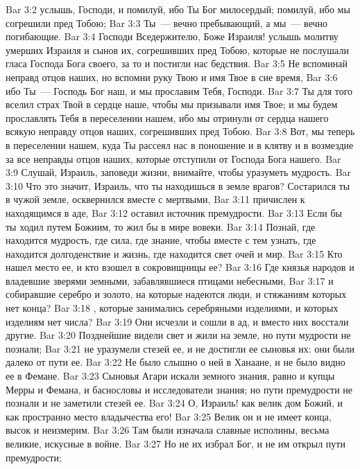 \vs Bar 3:2 услышь, Господи, и помилуй, ибо Ты Бог милосердый; помилуй, ибо мы согрешили пред Тобою;
\vs Bar 3:3 Ты~--- вечно пребывающий, а мы~--- вечно погибающие.
\vs Bar 3:4 Господи Вседержителю, Боже Израиля! услышь молитву умерших Израиля и сынов их, согрешивших пред Тобою, которые не послушали гласа Господа Бога своего, за то и постигли нас бедствия.
\vs Bar 3:5 Не вспоминай неправд отцов наших, но вспомни руку Твою и имя Твое в сие время,
\vs Bar 3:6 ибо Ты~--- Господь Бог наш, и мы прославим Тебя, Господи.
\vs Bar 3:7 Ты для того вселил страх Твой в сердце наше, чтобы мы призывали имя Твое; и мы будем прославлять Тебя в переселении нашем, ибо мы отринули от сердца нашего всякую неправду отцов наших, согрешивших пред Тобою.
\vs Bar 3:8 Вот, мы теперь в переселении нашем, куда Ты рассеял нас в поношение и в клятву и в возмездие за все неправды отцов наших, которые отступили от Господа Бога нашего.
\rsbpar\vs Bar 3:9 Слушай, Израиль, заповеди жизни, внимайте, чтобы уразуметь мудрость.
\vs Bar 3:10 Что это значит, Израиль, что ты находишься в земле врагов? Состарился ты в чужой земле, осквернился вместе с мертвыми,
\vs Bar 3:11 причислен к находящимся в аде,
\vs Bar 3:12 оставил источник премудрости.
\vs Bar 3:13 Если бы ты ходил путем Божиим, то жил бы в мире вовеки.
\vs Bar 3:14 Познай, где находится мудрость, где сила, где знание, чтобы вместе с тем узнать, где находится долгоденствие и жизнь, где находится свет очей и мир.
\vs Bar 3:15 Кто нашел место ее, и кто взошел в сокровищницы ее?
\vs Bar 3:16 Где князья народов и владевшие зверями земными, забавлявшиеся птицами небесными,
\vs Bar 3:17 и собиравшие серебро и золото, на которые надеются люди, и стяжаниям которых нет конца?
\vs Bar 3:18 , которые занимались серебряными изделиями, и которых изделиям нет числа?
\vs Bar 3:19 Они исчезли и сошли в ад, и вместо них восстали другие.
\vs Bar 3:20 Позднейшие видели свет и жили на земле, но пути мудрости не познали;
\vs Bar 3:21 не уразумели стезей ее, и не достигли ее сыновья их: они были далеко от пути ее.
\vs Bar 3:22 Не было слышно о ней в Ханаане, и не было видно ее в Фемане.
\vs Bar 3:23 Сыновья Агари искали земного знания, равно и купцы Мерры и Фемана, и баснословы и исследователи знания; но пути премудрости не познали и не заметили стезей ее.
\vs Bar 3:24 О, Израиль! как велик дом Божий, и как пространно место владычества его!
\vs Bar 3:25 Велик он и не имеет конца, высок и неизмерим.
\vs Bar 3:26 Там были изначала славные исполины, весьма великие, искусные в войне.
\vs Bar 3:27 Но не их избрал Бог, и не им открыл пути премудрости;
